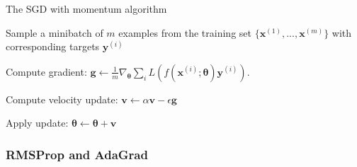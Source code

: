 \begin{algorithm}
\caption{The SGD with momentum algorithm}\label{alg:SGD_momentum}
\begin{algorithmic}


         Sample a minibatch of $m$ examples from the training set
        $\{\boldsymbol{x}^{(1)}, ..., \boldsymbol{x}^{(m)}\}$ with corresponding
        targets $\boldsymbol{y}^{(i)}$
        
        Compute gradient: $\boldsymbol{g} \gets
        \frac{1}{m}\nabla_{\boldsymbol\theta}
        \sum_{i}L(f(\boldsymbol{x}^{(i)};\boldsymbol{\theta})\boldsymbol{y}^{(i)})$.
        
        Compute velocity update: $\boldsymbol{v} \gets \alpha\boldsymbol{v} -
        \epsilon\boldsymbol{g}$

        Apply update: $\boldsymbol{\theta} \gets
        \boldsymbol{\theta}+\boldsymbol{v}$
    \EndWhile
\end{algorithmic}
\end{algorithm}




\subsubsection{RMSProp and AdaGrad}
\begin{comment}
    These are methods with adaptive learning rates. Chapter 8.5
    deeplarningbook.
\end{comment}




